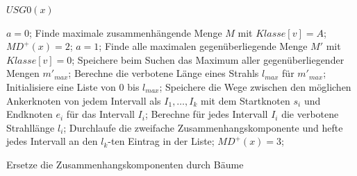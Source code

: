 \begin{algorithm}
\caption{$USG0(x)$}
\begin{algorithmic}[1]
\vspace{2mm} 
 \STATE $a=0$; Finde maximale zusammenhängende Menge $M$ mit $Klasse[v]=A$;
 \STATE $MD^+(x)=2$; $a=1$;\ENDIF
\STATE Finde alle maximalen gegenüberliegende Menge $M'$ mit $Klasse[v]=0$;
\STATE Speichere beim Suchen das Maximum aller gegenüberliegender Mengen $m'_{max}$;
\STATE Berechne die verbotene Länge eines Strahls $l_{max}$ für $m'_{max}$;
\STATE Initialisiere eine Liste von $0$ bis $l_{max}$;
\STATE Speichere die Wege zwischen den möglichen Ankerknoten von jedem Intervall als $I_1, \ldots , I_k$ mit dem Startknoten $s_i$ und Endknoten $e_i$ für das Intervall $I_i$;
\STATE Berechne für jedes Intervall $I_i$ die verbotene Strahllänge $l_i$;
\STATE Durchlaufe die zweifache Zusammenhangskomponente und hefte jedes Intervall an den $l_k$-ten Eintrag in der Liste;
\ENDIF
{} \STATE $MD^+(x)=3$; \ENDIF \ENDIF
\vspace{2mm}
\end{algorithmic}
\label{algberechnungungeradesonne1}
\end{algorithm}
\begin{algorithm}
\caption{Ersetze die Zusammenhangskomponenten durch Bäume}
\begin{algorithmic}[1]
\vspace{2mm}
\ENDFOR
\vspace{2mm}
\end{algorithmic}
\label{algreplace}
\end{algorithm}
\pagestyle{plain}
